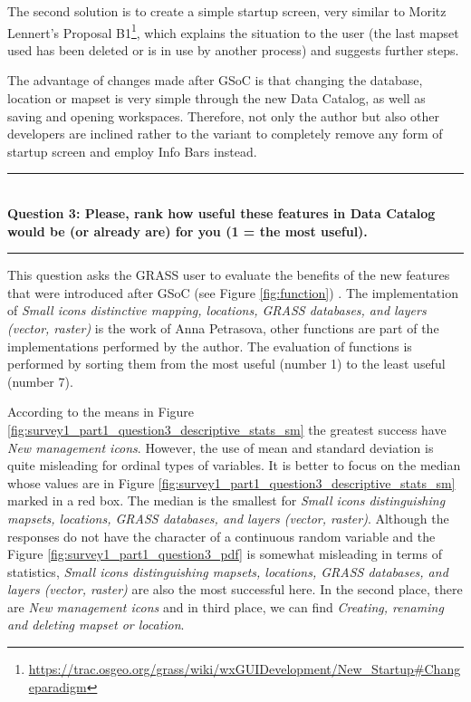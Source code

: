 \documentclass[a4paper,10pt,twoside]{article}
\begin{document}
The second solution is to create a simple startup screen, very similar to Moritz Lennert's Proposal B1\footnote{\url{https://trac.osgeo.org/grass/wiki/wxGUIDevelopment/New\_Startup\#Changeparadigm}}, which explains the situation to the user (the last mapset used has been deleted or is in use by another process) and suggests further steps.

The advantage of changes made after GSoC is that changing the database, location or mapset is very simple through the new Data Catalog, as well as saving and opening workspaces. Therefore, not only the author but also other developers are inclined rather to the variant to completely remove any form of startup screen and employ Info Bars instead.

\par\noindent\rule{\textwidth}{0.4pt} \\
\noindent \textbf{Question 3: Please, rank how useful these features in Data Catalog would be (or already are) for you (1 = the most useful).}
\par\noindent\rule{\textwidth}{0.4pt}

\noindent This question asks the GRASS user to evaluate the benefits of the new features that were introduced after GSoC (see Figure \ref{fig:function}) . The implementation of \textit{Small icons distinctive mapping, locations, GRASS databases, and layers (vector, raster)} is the work of Anna Petrasova, other functions are part of the implementations performed by the author. The evaluation of functions is performed by sorting them from the most useful (number 1) to the least useful (number 7).

According to the means in Figure \ref{fig:survey1_part1_question3_descriptive_stats_sm} the greatest success have \textit{New management icons}. However, the use of mean and standard deviation is quite misleading for ordinal types of variables. It is better to focus on the median whose values are in Figure \ref{fig:survey1_part1_question3_descriptive_stats_sm} marked in a red box. The median is the smallest for \textit{Small icons distinguishing mapsets, locations, GRASS databases, and layers (vector, raster)}. Although the responses do not have the character of a continuous random variable and the Figure \ref{fig:survey1_part1_question3_pdf} is somewhat misleading in terms of statistics, \textit{Small icons distinguishing mapsets, locations, GRASS databases, and layers (vector, raster) } are also the most successful here. In the second place, there are \textit{New management icons} and in third place, we can find \textit{Creating, renaming and deleting mapset or location}.
\end{document}
